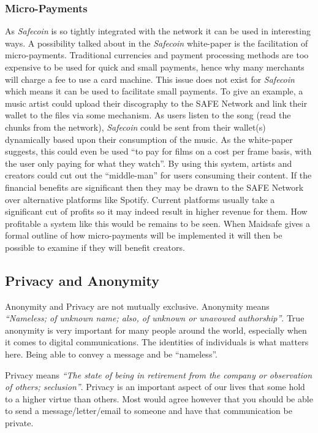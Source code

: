 \subsubsection{Micro-Payments}

As \textit{Safecoin} is so tightly integrated with the network it can be used in interesting ways. A possibility talked about in the \textit{Safecoin} white-paper\cite{lambert2015safecoin} is the facilitation of micro-payments. Traditional currencies and payment processing methods are too expensive to be used for quick and small payments, hence why many merchants will charge a fee to use a card machine. This issue does not exist for \textit{Safecoin} which means it can be used to facilitate small payments. To give an example, a music artist could upload their discography to the SAFE Network and link their wallet to the files via some mechanism. As users listen to the song (read the chunks from the network), \textit{Safecoin} could be sent from their wallet(s) dynamically based upon their consumption of the music. As the white-paper suggests, this could even be used ``to pay for films on a cost per frame basis, with the user only paying for what they watch''. By using this system, artists and creators could cut out the ``middle-man'' for users consuming their content. If the financial benefits are significant then they may be drawn to the SAFE Network over alternative platforms like Spotify. Current platforms usually take a significant cut of profits so it may indeed result in higher revenue for them. How profitable a system like this would be remains to be seen. When Maidsafe gives a formal outline of how micro-payments will be implemented it will then be possible to examine if they will benefit creators.

\subsection{Privacy and Anonymity}

Anonymity and Privacy are not mutually exclusive. Anonymity means \textit{``Nameless; of unknown name; also, of unknown or unavowed authorship''}\cite{anonymous}. True anonymity is very important for many people around the world, especially when it comes to digital communications. The identities of individuals is what matters here. Being able to convey a message and be ``nameless''. 

Privacy means \textit{``The state of being in retirement from the company or observation of others; seclusion''}\cite{privacy}. Privacy is an important aspect of our lives that some hold to a higher virtue than others. Most would agree however that you should be able to send a message/letter/email to someone and have that communication be private.


